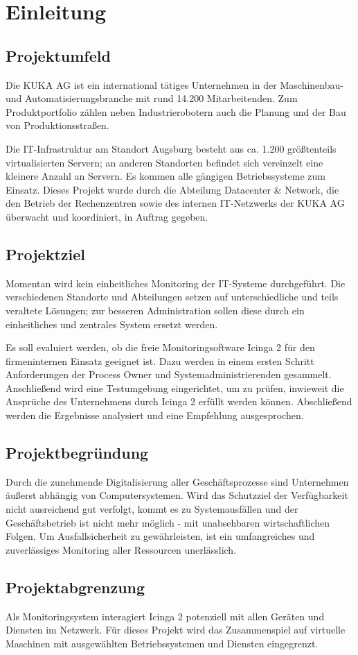\section{Einleitung}
\label{sec:Einleitung}

\subsection{Projektumfeld} 
\label{sec:Projektumfeld}
Die KUKA AG ist ein international tätiges Unternehmen in der Maschinenbau- und Automatisierungsbranche mit rund 14.200 Mitarbeitenden. Zum Produktportfolio zählen neben Industrierobotern auch die Planung und der Bau von Produktionsstraßen.

Die IT-Infrastruktur am Standort Augsburg besteht aus ca. 1.200 größtenteils virtualisierten Servern; an anderen Standorten befindet sich vereinzelt eine kleinere Anzahl an Servern. Es kommen alle gängigen Betriebssysteme zum Einsatz. Dieses Projekt wurde durch die Abteilung \glqq Datacenter \& Network\grqq{}, die den Betrieb der Rechenzentren sowie des internen IT-Netzwerks der KUKA AG überwacht und koordiniert, in Auftrag gegeben.

\subsection{Projektziel} 
\label{sec:Projektziel}
Momentan wird kein einheitliches Monitoring der IT-Systeme durchgeführt. Die verschiedenen Standorte und Abteilungen setzen auf unterschiedliche und teils veraltete Lösungen; zur besseren Administration sollen diese durch ein einheitliches und zentrales System ersetzt werden.

Es soll evaluiert werden, ob die freie Monitoringsoftware \glqq Icinga 2\grqq{} für den firmeninternen Einsatz geeignet ist. Dazu werden in einem ersten Schritt Anforderungen der Process Owner und Systemadministrierenden gesammelt. Anschließend wird eine Testumgebung eingerichtet, um zu prüfen, inwieweit die Ansprüche des Unternehmens durch \glqq Icinga 2\grqq{} erfüllt werden können. Abschließend werden die Ergebnisse analysiert und eine Empfehlung ausgesprochen.

\subsection{Projektbegründung} 
\label{sec:Projektbegruendung}
Durch die zunehmende Digitalisierung aller Geschäftsprozesse sind Unternehmen äußerst abhängig von Computersystemen. Wird das Schutzziel der Verfügbarkeit nicht ausreichend gut verfolgt, kommt es zu Systemausfällen und der Geschäftsbetrieb ist nicht mehr möglich - mit unabsehbaren wirtschaftlichen Folgen. Um Ausfallsicherheit zu gewährleisten, ist ein umfangreiches und zuverlässiges Monitoring aller Ressourcen unerlässlich.

\subsection{Projektabgrenzung} 
\label{sec:Projektabgrenzung}
Als Monitoringsystem interagiert \glqq Icinga 2\grqq{} potenziell mit allen Geräten und Diensten im Netzwerk. Für dieses Projekt wird das Zusammenspiel auf virtuelle Maschinen mit ausgewählten Betriebssystemen und Diensten eingegrenzt.